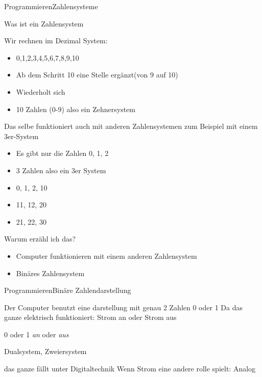 \begin{frame}{Programmieren}{Zahlensysteme}

	Was ist ein Zahlensystem

	Wir rechnen im Dezimal System:
	\begin{itemize}
	\item 0,1,2,3,4,5,6,7,8,9,10 
	\item Ab dem Schritt 10  eine Stelle ergänzt(von 9 auf 10) 
	\item Wiederholt sich
	\item 10 Zahlen (0-9) also ein Zehnersystem
	\end{itemize}
	
	Das selbe funktioniert auch mit anderen Zahlensystemen zum Beispiel mit einem 3er-System
	\begin{itemize}
	\item Es gibt nur die Zahlen 0, 1, 2
	\item 3 Zahlen also ein 3er System
	\item 0, 1, 2, 10
	\item 11, 12, 20
	\item 21, 22, 30
	\end{itemize}
	
	
	Warum erzähl ich das?
	\begin{itemize}
	\item Computer funktionieren mit einem anderen Zahlensystem
	\item Binäres Zahlensystem
	\end{itemize}
	
\end{frame}

\begin{frame}{Programmieren}{Binäre Zahlendarstellung}

	Der Computer benutzt eine darstellung mit genau 2 Zahlen 0 oder 1 
	Da das ganze elektrisch funktioniert: Strom an oder Strom aus	
	
	0 oder 1
	\emph{an} oder \textit{aus}

	Dualsystem, Zweiersystem	
	
	das ganze fällt unter Digitaltechnik
	Wenn Strom eine andere rolle spielt: Analog
	
\end{frame}


